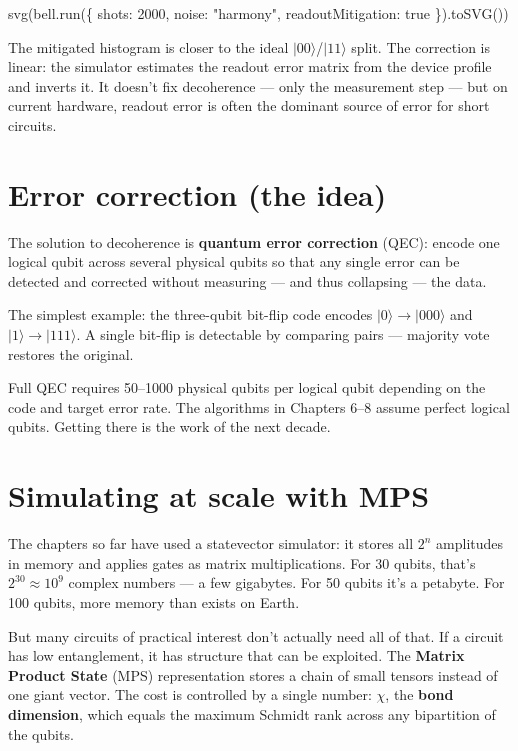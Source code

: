 \documentclass[
  11pt,
  letterpaper,
  oneside]{scrbook}
\newenvironment{Shaded}{\begin{snugshade}}{\end{snugshade}}
\newcommand{\NormalTok}[1]{\textcolor[rgb]{0.00,0.23,0.31}{#1}}
\begin{document}
\begin{Shaded}
\begin{Highlighting}[]
\NormalTok{svg(bell.run(\{ shots: 2000, noise: "harmony", readoutMitigation: true \}).toSVG())}
\end{Highlighting}
\end{Shaded}

The mitigated histogram is closer to the ideal
\(|00\rangle\)/\(|11\rangle\) split. The correction is linear: the
simulator estimates the readout error matrix from the device profile and
inverts it. It doesn't fix decoherence --- only the measurement step ---
but on current hardware, readout error is often the dominant source of
error for short circuits.

\section{Error correction (the idea)}\label{error-correction-the-idea}

The solution to decoherence is \textbf{quantum error correction} (QEC):
encode one logical qubit across several physical qubits so that any
single error can be detected and corrected without measuring --- and
thus collapsing --- the data.

The simplest example: the three-qubit bit-flip code encodes
\(|0\rangle \to |000\rangle\) and \(|1\rangle \to |111\rangle\). A
single bit-flip is detectable by comparing pairs --- majority vote
restores the original.

Full QEC requires 50--1000 physical qubits per logical qubit depending
on the code and target error rate. The algorithms in Chapters 6--8
assume perfect logical qubits. Getting there is the work of the next
decade.

\section{Simulating at scale with
MPS}\label{simulating-at-scale-with-mps}

The chapters so far have used a statevector simulator: it stores all
\(2^n\) amplitudes in memory and applies gates as matrix
multiplications. For 30 qubits, that's \(2^{30} \approx 10^9\) complex
numbers --- a few gigabytes. For 50 qubits it's a petabyte. For 100
qubits, more memory than exists on Earth.

But many circuits of practical interest don't actually need all of that.
If a circuit has low entanglement, it has structure that can be
exploited. The \textbf{Matrix Product State} (MPS) representation stores
a chain of small tensors instead of one giant vector. The cost is
controlled by a single number: \(\chi\), the \textbf{bond dimension},
which equals the maximum Schmidt rank across any bipartition of the
qubits.
\end{document}
